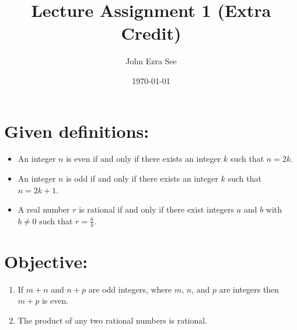\documentclass[11pt]{article}
\title{Lecture Assignment 1 (Extra Credit)}
\author{John Ezra See}
\date{\today}
\begin{document}
\maketitle
\section{Given definitions:}
\begin{itemize}
    \item An integer $n$ is even if and only if there exists an integer $k$ such that $n = 2k$.
    \item An integer $n$ is odd if and only if there exists an integer $k$ such that $n = 2k + 1$.
    \item A real number $r$ is rational if and only if there exist integers $a$ and $b$ with $b \neq 0$ such that $r = \frac{a}{b}$.
\end{itemize}

\section{Objective:}
\begin{enumerate}
    \item If $m + n$ and $n + p$ are odd integers, where $m$, $n$, and $p$ are integers then $m + p$ is even.
    \item The product of any two rational numbers is rational.
\end{enumerate}
\end{document}
